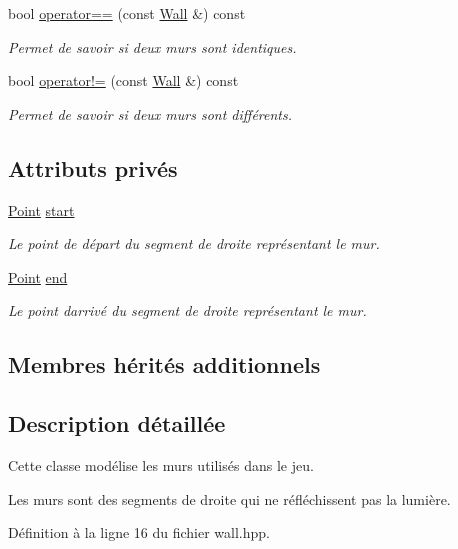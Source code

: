 \begin{DoxyCompactItemize}
bool \hyperlink{classWall_a56676feaace7ad556d8c94a195afb5da}{operator==} (const \hyperlink{classWall}{Wall} \&) const 
\begin{DoxyCompactList}\small\item\em Permet de savoir si deux murs sont identiques. \end{DoxyCompactList}\item 
bool \hyperlink{classWall_a2a918fa1c882900fe5cf97cf8d9da130}{operator!=} (const \hyperlink{classWall}{Wall} \&) const 
\begin{DoxyCompactList}\small\item\em Permet de savoir si deux murs sont différents. \end{DoxyCompactList}\end{DoxyCompactItemize}
\subsection*{Attributs privés}
\begin{DoxyCompactItemize}
\item 
\hyperlink{classPoint}{Point} \hyperlink{classWall_a05a052498fc50c585a8e8be95dc5af01}{start}
\begin{DoxyCompactList}\small\item\em Le point de départ du segment de droite représentant le mur. \end{DoxyCompactList}\item 
\hyperlink{classPoint}{Point} \hyperlink{classWall_a26e8075259c6cd51630b546f3e37d2a1}{end}
\begin{DoxyCompactList}\small\item\em Le point d\textquotesingle{}arrivé du segment de droite représentant le mur. \end{DoxyCompactList}\end{DoxyCompactItemize}
\subsection*{Membres hérités additionnels}


\subsection{Description détaillée}
Cette classe modélise les murs utilisés dans le jeu. 

Les murs sont des segments de droite qui ne réfléchissent pas la lumière. 

Définition à la ligne 16 du fichier wall.\+hpp.




